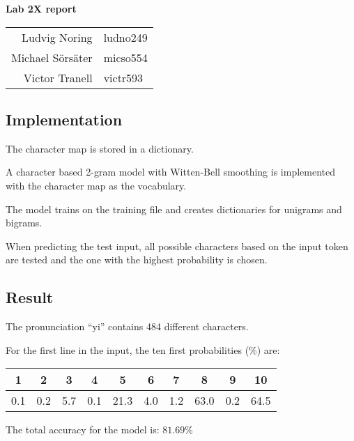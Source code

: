 \documentclass[12pt,a4paper]{article}
\begin{document}
\begin{center}

	\vspace{0.7cm}
	\LARGE
	\textbf{Lab 2X report }
	
	\Large
	\begin{table}[h]
	\centering
		\begin{tabular}{ r l }
		Ludvig Noring & ludno249 \\ Michael Sörsäter & micso554 \\ Victor Tranell &  victr593 \\
		\end{tabular}
	\end{table}
\end{center}

\subsection*{Implementation}
The character map is stored in a dictionary.

A character based 2-gram model with Witten-Bell smoothing is implemented with the character map as the vocabulary.

The model trains on the training file and creates dictionaries for unigrams and bigrams.

When predicting the test input, all possible characters based on the input token are tested and the one with the highest probability is chosen.

\subsection*{Result}

The pronunciation ``yi'' contains 484 different characters.

For the first line in the input, the ten first probabilities (\%) are:

	\begin{table}[h]
	\centering
		\begin{tabular}{ c c c c c c c c c c}
		1   & 2   & 3   & 4   & 5    & 6   & 7   & 8    & 9   & 10 \\ \hline
		0.1 & 0.2 & 5.7 & 0.1 & 21.3 & 4.0 & 1.2 & 63.0 & 0.2 & 64.5 
		\end{tabular}
	\end{table}

The total accuracy for the model is: $81.69 \%$
\end{document}
